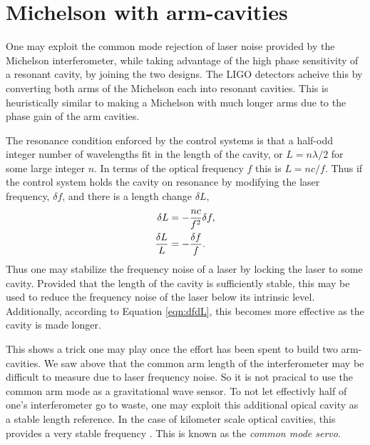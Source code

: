 \section{Michelson with arm-cavities}
\label{sec:armcav}
One may exploit the common mode rejection of laser noise provided by the Michelson interferometer, while taking advantage of the high phase sensitivity of a resonant cavity, by joining the two designs. %
The LIGO detectors acheive this by converting both arms of the Michelson each into resonant cavities. %
This is heuristically similar to making a Michelson with much longer arms due to the phase gain of the arm cavities.

The resonance condition enforced by the control systems is that a half-odd integer number of wavelengths fit in the length of the cavity, or $L=n\lambda/2$ for some large integer $n$. %
In terms of the optical frequency $f$ this is $L=nc/f$. %
Thus if the control system holds the cavity on resonance by modifying the laser frequency, $\delta f$, and there is a length change $\delta L$,
\begin{align}
\delta L &= -\frac{nc}{f^2}\delta f,\notag \\
\frac{\delta L}{L} &= -\frac{\delta f}{f}.
\label{eqn:dfdL}
\end{align}
Thus one may stabilize the frequency noise of a laser by locking the laser to some cavity. %
Provided that the length of the cavity is sufficiently stable, this may be used to reduce the frequency noise of the laser below its intrinsic level. %
Additionally, according to Equation \ref{eqn:dfdL}, this becomes more effective as the cavity is made longer.

This shows a trick one may play once the effort has been spent to build two arm-cavities. %
We saw above that the common arm length of the interferometer may be difficult to measure due to laser frequency noise. %
So it is not pracical to use the common arm mode as a gravitational wave sensor. %
To not let effectivly half of one's interferometer go to waste, one may exploit this additional opical cavity as a stable length reference. %
In the case of kilometer scale optical cavities, this provides a very stable frequency . %
This is known as the \emph{common mode servo}.


